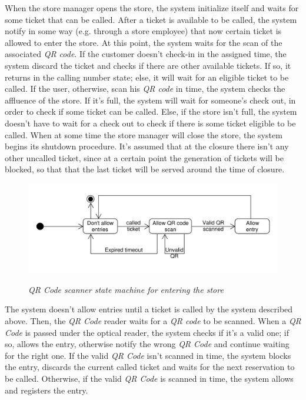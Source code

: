 \documentclass{article}
\begin{document}
		When the store manager opens the store, the system initialize itself and waits for some ticket that can be called. After a ticket is available to be called, the system notify in some way (e.g. through a store employee) that now certain ticket is allowed to enter the store. At this point, the system waits for the scan of the associated \emph{QR code}. If the customer doesn't check-in in the assigned time, the system discard the ticket and checks if there are other available tickets. If so, it returns in the calling number state; else, it will wait for an eligible ticket to be called. If the user, otherwise, scan his \emph{QR code} in time, the system checks the affluence of the store. If it's full, the system will wait for someone's check out, in order to check if some ticket can be called. Else, if the store isn't full, the system doesn't have to wait for a check out to check if there is some ticket eligible to be called. When at some time the store manager will close the store, the system begins its shutdown procedure. It's assumed that at the closure there isn't any other uncalled ticket, since at a certain point the generation of tickets will be blocked, so that that the last ticket will be served around the time of closure.
		
		\bigskip
		
		\begin{figure}[!h]
			
			\centering
			\hspace*{-2cm}\includegraphics[scale=0.7]{StateCharts/qr_scanner_uml.pdf} \\
			\caption{\emph{QR Code scanner state machine for entering the store}}
			
		\end{figure}
		
		The system doesn't allow entries until a ticket is called by the system described above. Then, the \emph{QR Code} reader waits for a \emph{QR code} to be scanned. When a \emph{QR Code} is passed under the optical reader, the system checks if it's a valid one; if so, allows the entry, otherwise notify the wrong \emph{QR Code} and continue waiting for the right one. If the valid \emph{QR Code} isn't scanned in time, the system blocks the entry, discards the current called ticket and waits for the next reservation to be called. Otherwise, if the valid \emph{QR Code} is scanned in time, the system allows and registers the entry.
		
\end{document}
